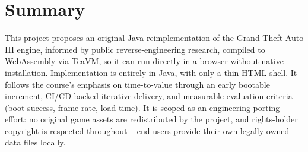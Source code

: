 \documentclass[11pt]{article}
\begin{document}
\section{Summary}
This project proposes an original Java reimplementation of the Grand Theft Auto III engine, informed by public reverse-engineering research, compiled to WebAssembly via TeaVM, so it can run directly in a browser without native installation. Implementation is entirely in Java, with only a thin HTML shell. It follows the course's emphasis on time-to-value through an early bootable increment, CI/CD-backed iterative delivery, and measurable evaluation criteria (boot success, frame rate, load time). It is scoped as an engineering porting effort: no original game assets are redistributed by the project, and rights-holder copyright is respected throughout -- end users provide their own legally owned data files locally.
\end{document}
